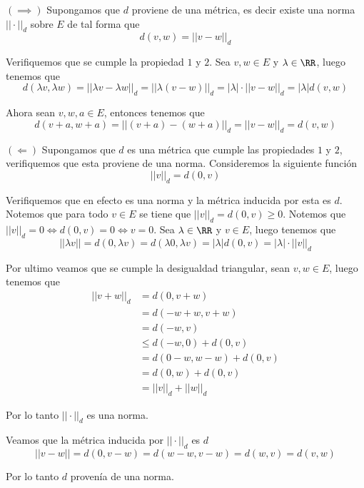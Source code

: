 \documentclass[a4paper,oneside,10.5pt]{USMArt}
\begin{document}
\begin{sol}
  $(\implies)$ Supongamos que $d$ proviene de una métrica, es decir existe una norma $||\cdot||_{d}$ sobre $E$
  de tal forma que
  \begin{equation*}
    d(v, w) = ||v - w||_{d}
  \end{equation*}

  Verifiquemos que se cumple la propiedad $1$ y $2$. Sea $v, w \in E$ y $\lambda \in \RR$, luego tenemos que
  \begin{equation*}
    d(\lambda v, \lambda w) = ||\lambda v - \lambda w||_{d} = ||\lambda(v - w)||_{d} = |\lambda| \cdot ||v - w||_{d} = |\lambda| d(v, w)
  \end{equation*}

  Ahora sean $v, w, a \in E$, entonces tenemos que
  \begin{equation*}
    d(v + a, w + a) = ||(v + a) - (w + a)||_{d} = ||v - w||_{d} = d(v, w)
  \end{equation*}

  $(\Longleftarrow)$ Supongamos que $d$ es una métrica que cumple las propiedades $1$ y $2$, verifiquemos que esta
  proviene de una norma. Consideremos la siguiente funci\'on
  \begin{equation*}
    ||v||_{d} = d(0, v)
  \end{equation*}

  Verifiquemos que en efecto es una norma y la métrica inducida por esta es $d$. Notemos que para todo $v \in E$ se tiene que $||v||_{d} = d(0, v) \geq 0$. Notemos que $||v||_{d} = 0 \iff d(0, v) = 0 \iff v = 0$.
  Sea $\lambda \in \RR$ y $v \in E$, luego tenemos que
  \begin{equation*}
    ||\lambda v|| = d(0, \lambda v) = d(\lambda 0, \lambda v) = |\lambda| d(0, v) = |\lambda| \cdot ||v||_{d}
  \end{equation*}

  Por ultimo veamos que se cumple la desigualdad triangular, sean $v, w \in E$, luego tenemos que
  \begin{align*}
    ||v + w||_{d} &= d(0, v + w)\\
                  &= d(-w + w, v + w)\\
                  &= d(-w, v)\\
                  &\leq d(-w, 0) + d(0, v)\\
                  &= d(0 - w, w - w) + d(0, v)\\
                  &=  d(0, w) + d(0, v)\\
                  &= ||v||_{d} + ||w||_{d}
  \end{align*}

  Por lo tanto $|| \cdot ||_{d}$ es una norma.

  Veamos que la métrica inducida por $|| \cdot ||_{d}$ es $d$
  \begin{equation*}
    ||v - w|| = d(0, v - w) = d(w - w, v - w) = d(w, v) = d(v, w)
  \end{equation*}

  Por lo tanto $d$ provenía de una norma.
\end{sol}
\end{document}
